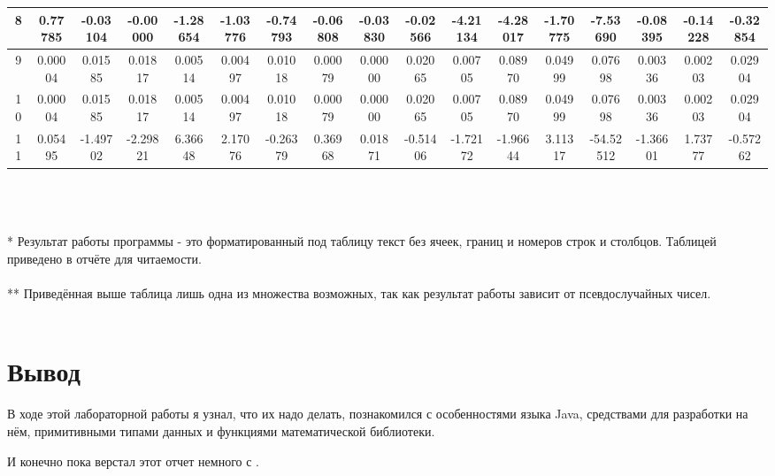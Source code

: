 \documentclass[11pt]{article}
\begin{document}
\begin{landscape}
\begin{tabular}{|c|c|c|c|c|c|c|c|c|c|c|c|c|c|c|c|c|}
\hline
  8 & 0.77785 &  -0.03104 &  -0.00000 &  -1.28654 &  -1.03776 &  -0.74793 &  -0.06808 &  -0.03830 &  -0.02566 &  -4.21134 &  -4.28017 &  -1.70775 &  -7.53690 &  -0.08395 &  -0.14228 &  -0.32854\\
\hline
   9 & 0.00004 &   0.01585 &   0.01817 &   0.00514 &   0.00497 &   0.01018 &   0.00079 &   0.00000 &   0.02065 &   0.00705 &   0.08970 &   0.04999 &   0.07698 &   0.00336 &   0.00203 &   0.02904\\
\hline
   10 & 0.00004 &   0.01585 &   0.01817 &   0.00514 &   0.00497 &   0.01018 &   0.00079 &   0.00000 &   0.02065 &   0.00705 &   0.08970 &   0.04999 &   0.07698 &   0.00336 &   0.00203 &   0.02904\\
\hline
   11 & 0.05495 &  -1.49702 &  -2.29821 &   6.36648 &   2.17076 &  -0.26379 &   0.36968 &   0.01871 &  -0.51406 &  -1.72172 &  -1.96644 &   3.11317 & -54.52512 &  -1.36601 &   1.73777 &  -0.57262\\
\hline
\end{tabular}
\\\\\\
\large
* Результат работы программы - это форматированный под таблицу текст без ячеек, границ и номеров строк и столбцов. Таблицей приведено в отчёте для читаемости.\\\\
** Приведённая выше таблица лишь одна из множества возможных, так как результат работы зависит от псевдослучайных чисел.\\\\
\end{landscape}
\large
\section{Вывод}
В ходе этой лабораторной работы я узнал, что их надо делать, познакомился с особенностями языка Java, средствами для разработки на нём, примитивными типами данных и функциями математической библиотеки.
\par
И конечно пока верстал этот отчет немного с \text{\LaTeX}.
\par
\end{document}
